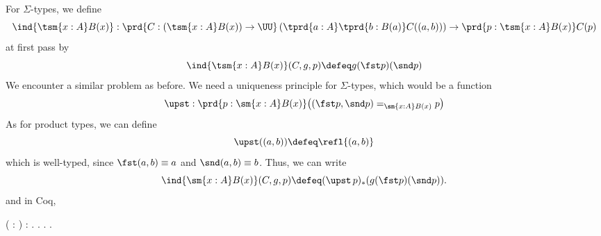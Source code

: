 For $\Sigma$-types, we define
\[
\ind{\tsm{x:A}B(x)} : \prd{C:(\tsm{x:A}B(x)) \to \UU}
\left(\tprd{a:A}\tprd{b:B(a)}C((a, b))\right) \to \prd{p: \tsm{x:A}B(x)}C(p)
\]
at first pass by
\[
\ind{\tsm{x:A}B(x)}(C, g, p)
\defeq
g(\fst p)(\snd p)
\]
We encounter a similar problem as before.  We need a uniqueness principle for
$\Sigma$-types, which would be a function
\[
\upst : \prd{p : \sm{x:A}B(x)} \big(
(\fst p, \snd p) =_{\sm{x:A}B(x)} p
\big)
\]
As for product types, we can define
\[
\upst((a, b)) \defeq \refl{(a, b)}
\]
which is well-typed, since $\fst(a, b) \equiv a$ and $\snd(a, b) \equiv b$.
Thus, we can write
\[
\ind{\sm{x:A}B(x)}(C, g, p) \defeq (\upst\, p)_{*}(g(\fst p)(\snd p)).
\]
and in Coq, \begin{coqdoccode}
\coqdocemptyline
\coqdocindent{1.00em}
  ( :    ) : \coqdocnotation{(}\coqdocnotation{;} \coqdocnotation{)} \coqdocnotation{=} .\coqdoceol
\coqdocindent{2.00em}
 . .\coqdoceol
\coqdocindent{1.00em}
.\coqdoceol
\coqdocemptyline
\coqdocindent{1.00em}

\end{coqdoccode}
